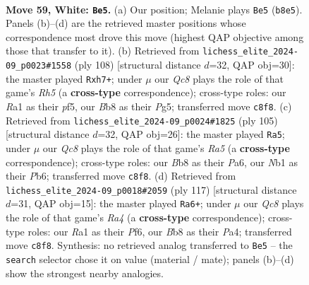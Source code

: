 \documentclass[11pt]{article}
\begin{document}
\clearpage

\begin{figure}[p]\centering
\begin{subfigure}{0.46\textwidth}\centering
\resizebox{\linewidth}{!}{%
\newchessgame
\chessboard[
  setfen={1BQ5/7r/1k6/p2p1p2/P6P/8/8/RN4K1 w - - 1 59},
  showmover=false,
  pgfstyle=straightmove, color=movearrow, markmove={b8-e5}
]}
\caption{}
\end{subfigure}\hfill
\begin{subfigure}{0.46\textwidth}\centering
\resizebox{\linewidth}{!}{%
\newchessgame
\chessboard[
  setfen={8/p4k1p/8/P3rpPR/8/r7/3K4/8 w - - 0 55},
  showmover=false,
  pgfstyle=straightmove, color=movearrow, markmove={h5-h7}
]}
\caption{}
\end{subfigure}
\\[4pt]
\begin{subfigure}{0.46\textwidth}\centering
\resizebox{\linewidth}{!}{%
\newchessgame
\chessboard[
  setfen={6R1/3k4/pp6/6p1/r1P4p/2K5/6PP/8 b - - 5 53},
  showmover=false,
  pgfstyle=straightmove, color=movearrow, markmove={a4-a5}
]}
\caption{}
\end{subfigure}\hfill
\begin{subfigure}{0.46\textwidth}\centering
\resizebox{\linewidth}{!}{%
\newchessgame
\chessboard[
  setfen={7R/5k2/2KP1p2/r7/p6p/P7/5P2/8 b - - 6 59},
  showmover=false,
  pgfstyle=straightmove, color=movearrow, markmove={a5-a6}
]}
\caption{}
\end{subfigure}
\caption{\textbf{Move 59, White: \texttt{Be5}.} (a) Our position; Melanie plays \texttt{Be5} (\texttt{b8e5}). Panels (b)--(d) are the retrieved master positions whose correspondence most drove this move (highest QAP objective among those that transfer to it). (b) Retrieved from \texttt{lichess\_elite\_2024-09\_p0023\#1558} (ply 108) [structural distance $d$=32, QAP obj=30]: the master played \texttt{Rxh7+}; under $\mu$ our \emph{Qc8} plays the role of that game's \emph{Rh5} (a \textbf{cross-type} correspondence); cross-type roles: our \emph{R}a1 as their \emph{p}f5, our \emph{B}b8 as their \emph{P}g5; transferred move \texttt{c8f8}. (c) Retrieved from \texttt{lichess\_elite\_2024-09\_p0024\#1825} (ply 105) [structural distance $d$=32, QAP obj=26]: the master played \texttt{Ra5}; under $\mu$ our \emph{Qc8} plays the role of that game's \emph{Ra5} (a \textbf{cross-type} correspondence); cross-type roles: our \emph{B}b8 as their \emph{P}a6, our \emph{N}b1 as their \emph{P}b6; transferred move \texttt{c8f8}. (d) Retrieved from \texttt{lichess\_elite\_2024-09\_p0018\#2059} (ply 117) [structural distance $d$=31, QAP obj=15]: the master played \texttt{Ra6+}; under $\mu$ our \emph{Qc8} plays the role of that game's \emph{Ra4} (a \textbf{cross-type} correspondence); cross-type roles: our \emph{R}a1 as their \emph{P}f6, our \emph{B}b8 as their \emph{P}a4; transferred move \texttt{c8f8}. Synthesis: no retrieved analog transferred to \texttt{Be5} -- the \texttt{search} selector chose it on value (material / mate); panels (b)--(d) show the strongest nearby analogies.}
\label{fig:thought-m116}
\end{figure}
\end{document}
